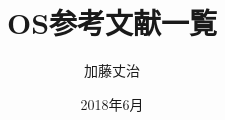 \documentclass[a4j,10pt,oneside,openany]{jsbook}
\title{OS参考文献一覧}
\author{加藤丈治}
\date{2018年6月}
\begin{document}
%
%
\maketitle
\mainmatter
\nocite{*}
 
 
\end{document}
